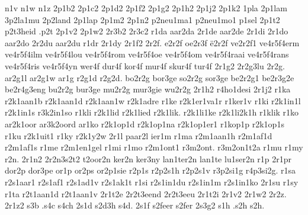 {n1v
n1w
n1z
%
2p1b2
2p1c2
2p1d2
2p1f2
2p1g2
2p1h2
2p1j2
2p1k2
1pla
2p1lam
3p2la1mu
2p2land
2p1lap
2p1m2
2p1n2
p2neu1ma1
p2neu1mo1
p1sel
2p1t2
p2t3heid
.p2t
2p1v2
2p1w2
%
2r3b2
2r3c2
r1da
aar2da
2r1de
aar2de
2r1di
2r1do
aar2do
2r2du
aar2du
r1dr
2r1dy
2r1f2
2r2f.
e2r2f
oe2r3f
ë2r2f
ve2r2f1
ve4r5f4erm
ve4r5f4ilm
ve4r5f4lou
ve4r5f4rom
ve4r5f4oe
ve4r5f4om
ve4r5f4raai
ve4r5f4rans
ve4r5f4ris
ve4r5f4yn
wer4f
dur4f
kor4f
mur4f
skur4f
tur4f
%
2r1g2
2r2g3lu
2r2g.
ar2g1l
ar2g1w
ar1g
r2g1d
r2g2d.
bo2r2g
bor3ge
so2r2g
sor3ge
be2r2g1
be2r3g2e
be2r4g3eng
bu2r2g
bur3ge
mu2r2g
mur3gie
wu2r2g
2r1h2
r4ho1desi
2r1j2
%
r1ka
r2k1aan1b
r2k1aan1d
r2k1aan1w
r2k1adre
r1ke
r2k1er1va1r
r1ker1v
r1ki
r2k1in1l
r2k1in1s
r3k2in1so
r1kli
r2k1lid
r2k1lied
r2k1lik.
r2k1li1ke
r2k1li2k1h
r1klik
r1ko
ar2k1oor
ar3k2oord
ar1ko
r2k1op1d
r2k1op1na
r2k1op1er1
r1kop1p
r2k1op1s
r1ku
r2k1uit1
r1ky
r2k1y2w
%
%
2r1l
paar2l
ier1m
r1ma
r2m1aan1h
r2m1af1d
r2m1af1s
r1me
r2m1en1gel
r1mi
r1mo
r2m1ont1
r3m2ont.
r3m2on1t2a
r1mu
r1my
r2n.
2r1n2
2r2n3s2t2
t2oor2n
ker2n
ker3ny
lan1ter2n
lan1te
lu1ser2n
r1p
2r1pr
dor2p
dor3pe
or1p
or2ps
or2p1sie
r2p1s
r2p2s1h
r2p2s1v
r3p2si1g
r4p3si2g.
%
r1sa
r2s1aar1
r2s1af1
r2s1ad1v
r2s1ak1t
r1si
r2s1in1du
r2s1in1m
r2s1in1ko
2r1su
r1sy
r1ta
r2t1aan1d
r2t1aan1v
2r1t2e
2r2t3eend
2r2t3eeu
2r1t2i
2r1v2
2r1w2
%
2r2z.
2r1z2
%
s3b
.s4c
s4ch
2s1d
s2d3h
s4d.
2s1f
s2feer
s2fer
2s3g2
s1h
.s2h
s2h.
}
